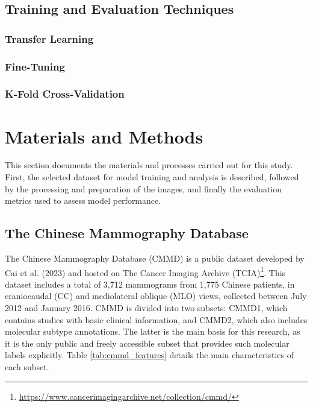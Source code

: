 \documentclass[a4paper,10pt]{book}
\begin{document}
\section{Training and Evaluation Techniques}
\subsection{Transfer Learning}
\subsection{Fine-Tuning}
\subsection{K-Fold Cross-Validation}
\chapter{Materials and Methods}

This section documents the materials and processes carried out for this study. First, the selected dataset for model training and analysis is described, followed by the processing and preparation of the images, and finally the evaluation metrics used to assess model performance.

\section{The Chinese Mammography Database}

The Chinese Mammography Database (CMMD) is a public dataset developed by Cai et al. (2023) \cite{cai_online_2023} and hosted on The Cancer Imaging Archive (TCIA)\footnote{\url{https://www.cancerimagingarchive.net/collection/cmmd/}}. This dataset includes a total of 3,712 mammograms from 1,775 Chinese patients, in craniocaudal (CC) and mediolateral oblique (MLO) views, collected between July 2012 and January 2016. CMMD is divided into two subsets: CMMD1, which contains studies with basic clinical information, and CMMD2, which also includes molecular subtype annotations. The latter is the main basis for this research, as it is the only public and freely accessible subset that provides such molecular labels explicitly. Table \ref{tab:cmmd_features} details the main characteristics of each subset.
\end{document}
